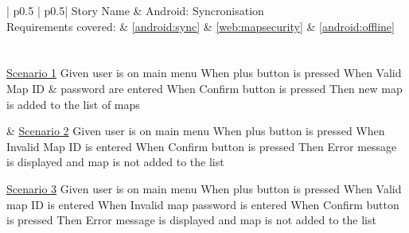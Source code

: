 \begin{longtable}{| p{} | p{}|}
	\hline
	\newline Story Name & \newline Android: Syncronisation\\\hline
	\newline Requirements covered: & \newline \ref{android:sync} \& \ref{web:mapsecurity} \& \ref{android:offline} \\\hline
	\\\hline
	\\\hline
	\newline\underline{Scenario 1}\newline
	Given user is on main menu \newline
	When plus button is pressed \newline 
	When Valid Map ID \& password are entered \newline 
	When Confirm button is pressed \newline 
	Then new map is added to the list of maps\newline
	
	& 
	\newline\underline{Scenario 2}\newline
	Given user is on main menu \newline
	When plus button is pressed \newline 
	When Invalid Map ID is entered \newline 
	When Confirm button is pressed \newline 
	Then Error message is displayed and map is not added to the list\newline\\\hline
	
	\newline\underline{Scenario 3}\newline
	Given user is on main menu \newline
	When plus button is pressed \newline 
	When Valid map ID is entered \newline 
	When Invalid map password is entered \newline 
	When Confirm button is pressed \newline 
	Then Error message is displayed and map is not added to the list\newline
	

\end{longtable}
